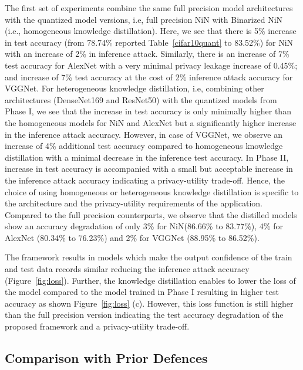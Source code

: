 The first set of experiments combine the same full precision model architectures with the quantized model versions, i.e, full precision NiN with Binarized NiN (i.e., homogeneous knowledge distillation).
Here, we see that there is 5\% increase in test accuracy (from 78.74\% reported Table~\ref{cifar10quant} to 83.52\%) for NiN with an increase of 2\% in inference attack.
Similarly, there is an increase of 7\% test accuracy for AlexNet with a very minimal privacy leakage increase of 0.45\%; and increase of 7\% test accuracy at the cost of 2\% inference attack accuracy for VGGNet.
For heterogeneous knowledge distillation, i.e, combining other architectures (DenseNet169 and ResNet50) with the quantized models from Phase I, we see that the increase in test accuracy is only minimally higher than the homogeneous models for NiN and AlexNet but a significantly higher increase in the inference attack accuracy.
However, in case of VGGNet, we observe an increase of 4\% additional test accuracy compared to homogeneous knowledge distillation with a minimal decrease in the inference test accuracy.
In Phase II, increase in test accuracy is accompanied with a small but acceptable increase in the inference attack accuracy indicating a privacy-utility trade-off.
Hence, the choice of using homogeneous or heterogeneous knowledge distillation is specific to the architecture and the privacy-utility requirements of the application.
Compared to the full precision counterparts, we observe that the distilled models show an accuracy degradation of only 3\% for NiN(86.66\% to 83.77\%), 4\% for AlexNet (80.34\% to 76.23\%) and 2\% for VGGNet (88.95\% to 86.52\%).

The \method\hspace{0.02in} framework results in models which make the output confidence of the train and test data records similar reducing the inference attack accuracy (Figure~\ref{fig:loss}).
Further, the knowledge distillation enables to lower the loss of the model compared to the model trained in Phase I resulting in higher test accuracy as shown Figure~\ref{fig:loss} (c).
However, this loss function is still higher than the full precision version indicating the test accuracy degradation of the proposed framework and a privacy-utility trade-off.

\subsection{Comparison with Prior Defences}
\label{eval-defences}

